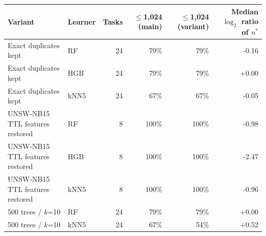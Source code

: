 \begin{tabular}{llrrrr}
\toprule
Variant & Learner & Tasks & $\le$1,024 (main) & $\le$1,024 (variant) & Median $\log_2$ ratio of $n^*$ \\
\midrule
Exact duplicates kept & RF & 24 & 79\% & 79\% & -0.16 \\
Exact duplicates kept & HGB & 24 & 79\% & 79\% & +0.00 \\
Exact duplicates kept & kNN5 & 24 & 67\% & 67\% & -0.05 \\
UNSW-NB15 TTL features restored & RF & 8 & 100\% & 100\% & -0.98 \\
UNSW-NB15 TTL features restored & HGB & 8 & 100\% & 100\% & -2.47 \\
UNSW-NB15 TTL features restored & kNN5 & 8 & 100\% & 100\% & -0.96 \\
500 trees / $k$=10 & RF & 24 & 79\% & 79\% & +0.00 \\
500 trees / $k$=10 & kNN5 & 24 & 67\% & 54\% & +0.52 \\
\bottomrule
\end{tabular}
